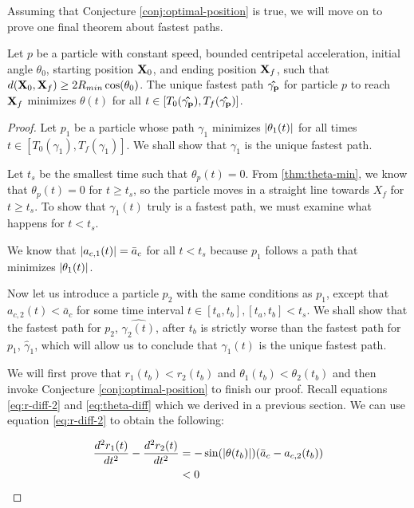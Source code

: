 Assuming that Conjecture \ref{conj:optimal-position} is true, we will move on to prove one final theorem about fastest paths.

\begin{theorem}
  Let  $p$ be a particle with constant speed, bounded centripetal acceleration, initial angle $\theta_0$, starting position $\mathbf{X}_0$, and ending position $\mathbf{X}_f$, such that $d(\bvec{X}_0, \bvec{X}_f) \ge 2 R_{min} \cos\paren{\theta_0}$. The unique fastest path $\mathbf{\hat{\gamma_p}}$ for particle $p$ to reach $\mathbf{X}_f$ minimizes $\theta(t)$ for all $t \in [T_0(\mathbf{\hat{\gamma_p}}), T_f(\mathbf{\hat{\gamma_p}})]$.
  \label{thm:restricted-theta}
\end{theorem}
\begin{proof}
Let $p_1$ be a particle whose path $\gamma_1$ minimizes $\abs{\theta_1(t)}$ for all times $t \in [T_0(\gamma_1), T_f(\gamma_1)]$. We shall show that $\gamma_1$ is the unique fastest path.

Let $t_s$ be the smallest time such that $\theta_p(t) = 0$. From \ref{thm:theta-min}, we know that $\theta_p(t) = 0$ for $t \ge t_s$, so the particle moves in a straight line towards $X_f$ for $t \ge t_s$. To show that $\gamma_1(t)$ truly is a fastest path, we must examine what happens for $t < t_s$.

We know that $\abs{a_{c,1}(t)} = \bar{a}_c$ for all $t < t_s$ because $p_1$ follows a path that minimizes $\abs{\theta_1(t)}$.

Now let us introduce a particle $p_2$ with the same conditions as $p_1$, except that $a_{c,2}(t) < \bar{a}_c$ for some time interval $t \in [t_a, t_b], [t_a, t_b] < t_s$. We shall show that the fastest path for $p_2$, $\hat{\gamma_2(t)}$, after $t_b$ is strictly worse than the fastest path for $p_1$, $\hat{\gamma}_1$, which will allow us to conclude that $\gamma_1(t)$ is the unique fastest path.

We will first prove that $r_1(t_b) < r_2(t_b)$ and $\theta_1(t_b) < \theta_2(t_b)$ and then invoke Conjecture \ref{conj:optimal-position} to finish our proof. Recall equations \ref{eq:r-diff-2} and \ref{eq:theta-diff} which we derived in a previous section. We can use equation \ref{eq:r-diff-2} to obtain the following:

\begin{align*}
  \frac{d^2 r_1(t)}{d t^2} - \frac{d^2 r_2(t)}{d t^2}& = - \sin\paren{\abs{\theta(t_b)}} \paren{\bar{a}_c - a_{c,2}(t_b)}\\
  & < 0
\end{align*}


\end{proof}
